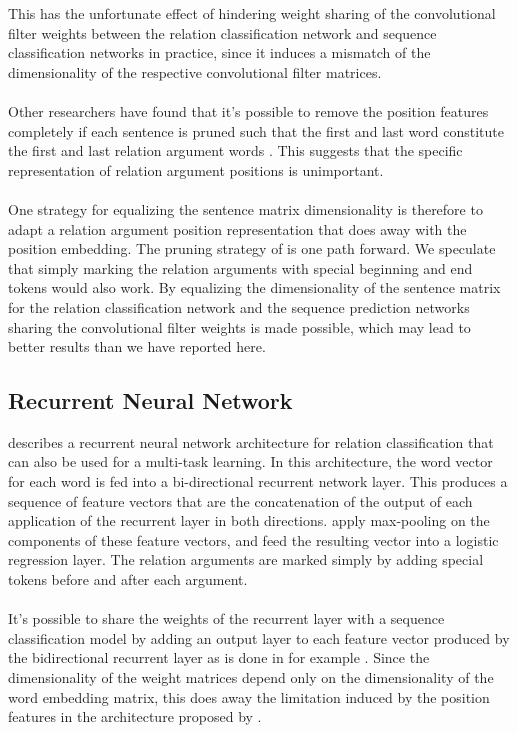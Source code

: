 This has the unfortunate effect of hindering weight sharing of the convolutional filter weights between the relation classification network and sequence classification networks in practice, since it induces a mismatch of the dimensionality of the respective convolutional filter matrices.
\\\\
Other researchers have found that it's possible to remove the position features completely if each sentence is pruned such that the first and last word constitute the first and last relation argument words \citep{santos2015}. This suggests that the specific representation of relation argument positions is unimportant.
\\\\
One strategy for equalizing the sentence matrix dimensionality is therefore to adapt a relation argument position representation that does away with the position embedding. The pruning strategy of \citep{santos2015} is one path forward. We speculate that simply marking the relation arguments with special beginning and end tokens would also work. By equalizing the dimensionality of the sentence matrix for the relation classification network and the sequence prediction networks sharing the convolutional filter weights is made possible, which may lead to better results than we have reported here.

\subsection{Recurrent Neural Network}
\citet{zhang2015} describes a recurrent neural network architecture for relation classification that can also be used for a multi-task learning. In this architecture, the word vector for each word is fed into a bi-directional recurrent network layer. This produces a sequence of feature vectors that are the concatenation of the output of each application of the recurrent layer in both directions. \citet{zhang2015} apply max-pooling on the components of these feature vectors, and feed the resulting vector into a logistic regression layer. The relation arguments are marked simply by adding special tokens before and after each argument.
\\\\
It's possible to share the weights of the recurrent layer with a sequence classification model by adding an output layer to each feature vector produced by the bidirectional recurrent layer as is done in for example \citet{bingel2017}. Since the dimensionality of the weight matrices depend only on the dimensionality of the word embedding matrix, this does away the limitation induced by the position features in the architecture proposed by \citet{nguyen2015}.

